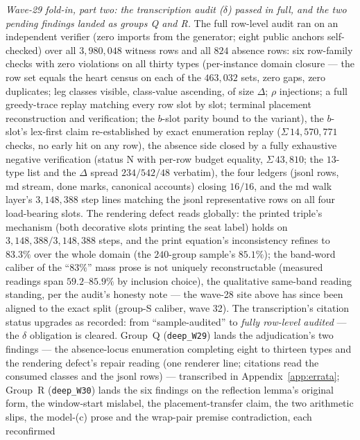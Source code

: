 \emph{Wave-29 fold-in, part two: the transcription audit ($\delta$) passed
in full, and the two pending findings landed as groups Q and R.} The full
row-level audit ran on an independent verifier (zero imports from the
generator; eight public anchors self-checked) over all $3{,}980{,}048$
witness rows and all $824$ absence rows: six row-family checks with zero
violations on all thirty types (per-instance domain closure --- the row
set equals the heart census on each of the $463{,}032$ sets, zero gaps,
zero duplicates; leg classes visible, class-value ascending, of size
$\Delta$; $\rho$ injections; a full greedy-trace replay matching every
row slot by slot; terminal placement reconstruction and verification; the
$b$-slot parity bound to the variant), the $b$-slot's lex-first claim
re-established by exact enumeration replay ($\Sigma\,14{,}570{,}771$
checks, no early hit on any row), the absence side closed by a fully
exhaustive negative verification (status $\mathrm{N}$ with per-row budget
equality, $\Sigma\,43{,}810$; the $13$-type list and the $\Delta$ spread
$234/542/48$ verbatim), the four ledgers (jsonl rows, md stream, done
marks, canonical accounts) closing $16/16$, and the md walk layer's
$3{,}148{,}388$ step lines matching the jsonl representative rows on all
four load-bearing slots. The rendering defect reads globally: the printed
triple's mechanism (both decorative slots printing the seat label) holds
on $3{,}148{,}388/3{,}148{,}388$ steps, and the print equation's
inconsistency refines to $83.3\%$ over the whole domain (the
$240$-group sample's $85.1\%$); the band-word caliber of the ``$83\%$''
mass prose is not uniquely reconstructable (measured readings span
$59.2$--$85.9\%$ by inclusion choice), the qualitative same-band reading
standing, per the audit's honesty note --- the wave-28 site above has
since been aligned to the exact split (group-S caliber, wave 32). The transcription's citation
status upgrades as recorded: from ``sample-audited'' to \emph{fully
row-level audited} --- the $\delta$ obligation is cleared. Group~Q
(\texttt{deep\_W29}) lands the adjudication's two findings --- the
absence-locus enumeration completing eight to thirteen types and the
rendering defect's repair reading (one renderer line; citations read the
consumed classes and the jsonl rows) --- transcribed in
Appendix~\ref{app:errata}; Group~R (\texttt{deep\_W30}) lands the six
findings on the reflection lemma's original form, the window-start
mislabel, the placement-transfer claim, the two arithmetic slips, the
model-(c) prose and the wrap-pair premise contradiction, each reconfirmed
